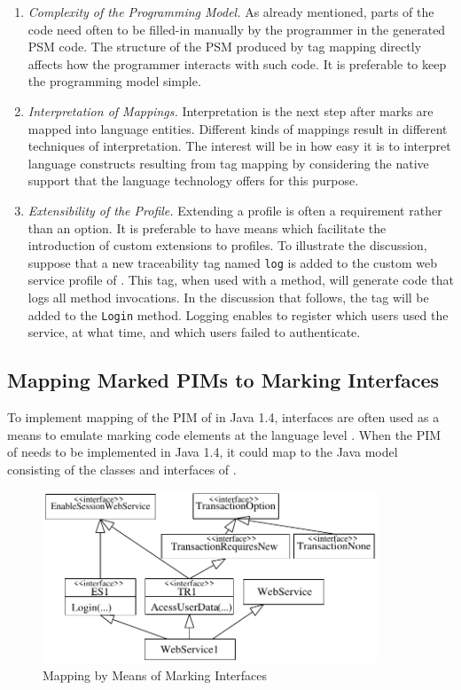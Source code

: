 \begin{enumerate}
\item \textit{Complexity of the Programming Model.} As already mentioned, parts of the code need often to be filled-in manually by the programmer in the generated PSM code. The structure of the PSM produced by tag mapping directly affects how the programmer interacts with such code. It is preferable to keep the programming model simple.

\item \textit{Interpretation of Mappings.} Interpretation is the next step after marks are mapped into language entities. Different kinds of mappings result in different techniques of interpretation. The interest will be in how easy it is to interpret language constructs resulting from tag mapping by considering the native support that the language technology offers for this purpose.

\item \textit{Extensibility of the Profile.} Extending a profile is often a requirement rather than an option. It is preferable to have means which facilitate the introduction of custom extensions to profiles. To illustrate the discussion, suppose that a new traceability tag named { \tt log} is added to the custom web service profile of . This tag, when used with a method, will generate code that logs all method invocations. In the discussion that follows, the tag will be added to the { \tt Login} method. Logging enables to register which users used the service, at what time, and which users failed to authenticate.
\end{enumerate}

\subsection{Mapping Marked PIMs to Marking Interfaces}
\label{attributes}

To implement mapping of the PIM of  in Java 1.4, interfaces are often used as a means to emulate marking code elements at the language level \cite{design.attrib,mda.frankel}. When the PIM of  needs to be implemented in Java 1.4, it could map to the Java model consisting of the classes and interfaces of .

\begin{figure}[ht]
	\begin{center}
		\includegraphics[width=10cm,height=!]{ch03/uml2}
	\end{center}
	\caption{Mapping by Means of Marking Interfaces}
	\label{fig.uml.2}
\end{figure}

